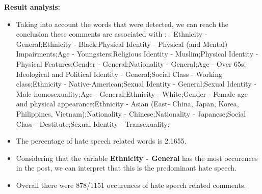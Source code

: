 \documentclass[11pt]{article}
\begin{document}
\textbf{\Large Result analysis:}

\begin{itemize}\item Taking into account the words that were detected, we can reach the conclusion these comments are associated with : : Ethnicity - General;Ethnicity - Black;Physical Identity - Physical (and Mental) Impairments;Age - Youngsters;Religious Identity - Muslim;Physical Identity - Physical Features;Gender - General;Nationality - General;Age - Over 65s; Ideological and Political Identity - General;Social Class - Working class;Ethnicity - Native-American;Sexual Identity - General;Sexual Identity - Male homosexuality;Age - General;Ethnicity - White;Gender - Female age and physical appearance;Ethnicity - Asian (East- China, Japan, Korea, Philippines, Vietnam);Nationality - Chinese;Nationality - Japanese;Social Class - Destitute;Sexual Identity - Transexuality;%

\item The percentage of hate speech related words is 2.1655.

\item Considering that the variable \textbf{Ethnicity - General} has the most occurences in the post, we can interpret that this is the predominant hate speech.

\item Overall there were 878/1151 occurences of hate speech related comments.\end{itemize}
\end{document}
